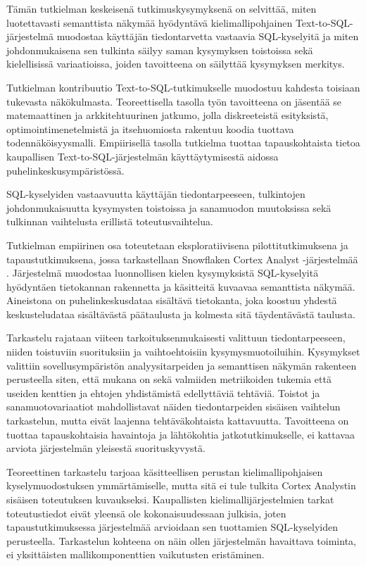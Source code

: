 Tämän tutkielman keskeisenä tutkimuskysymyksenä on selvittää, miten
luotettavasti semanttista näkymää hyödyntävä kielimallipohjainen
Text-to-SQL-järjestelmä muodostaa käyttäjän tiedontarvetta vastaavia
SQL-kyselyitä ja miten johdonmukaisena sen tulkinta säilyy saman
kysymyksen toistoissa sekä kielellisissä variaatioissa, joiden
tavoitteena on säilyttää kysymyksen merkitys.

Tutkielman kontribuutio Text-to-SQL-tutkimukselle muodostuu kahdesta toisiaan tukevasta näkökulmasta. Teoreettisella tasolla työn tavoitteena on jäsentää se matemaattinen ja arkkitehtuurinen jatkumo, jolla diskreeteistä esityksistä, optimointimenetelmistä ja itsehuomiosta rakentuu koodia tuottava todennäköisyysmalli. Empiirisellä tasolla tutkielma tuottaa tapauskohtaista tietoa
kaupallisen Text-to-SQL-järjestelmän käyttäytymisestä aidossa
puhelinkeskusympäristössä.

SQL-kyselyiden vastaavuutta käyttäjän tiedontarpeeseen, tulkintojen
johdonmukaisuutta kysymysten toistoissa ja sanamuodon muutoksissa
sekä tulkinnan vaihtelusta erillistä toteutusvaihtelua.

Tutkielman empiirinen osa toteutetaan eksploratiivisena
pilottitutkimuksena ja tapaustutkimuksena, jossa tarkastellaan
Snowflaken Cortex Analyst -järjestelmää \cite{CortexAnalyst}.
Järjestelmä muodostaa luonnollisen kielen kysymyksistä SQL-kyselyitä
hyödyntäen tietokannan rakennetta ja käsitteitä kuvaavaa semanttista
näkymää. Aineistona on puhelinkeskusdataa sisältävä tietokanta, joka
koostuu yhdestä keskusteludataa sisältävästä päätaulusta ja kolmesta
sitä täydentävästä taulusta.

Tarkastelu rajataan viiteen tarkoituksenmukaisesti valittuun
tiedontarpeeseen, niiden toistuviin suorituksiin ja vaihtoehtoisiin
kysymysmuotoiluihin. Kysymykset valittiin sovellusympäristön
analyysitarpeiden ja semanttisen näkymän rakenteen perusteella siten,
että mukana on sekä valmiiden metriikoiden tukemia että useiden
kenttien ja ehtojen yhdistämistä edellyttäviä tehtäviä. Toistot ja
sanamuotovariaatiot mahdollistavat näiden tiedontarpeiden sisäisen
vaihtelun tarkastelun, mutta eivät laajenna tehtäväkohtaista
kattavuutta. Tavoitteena on tuottaa tapauskohtaisia havaintoja ja
lähtökohtia jatkotutkimukselle, ei kattavaa arviota järjestelmän
yleisestä suorituskyvystä.

Teoreettinen tarkastelu tarjoaa käsitteellisen perustan kielimallipohjaisen kyselymuodostuksen ymmärtämiselle, mutta sitä ei tule tulkita Cortex Analystin sisäisen toteutuksen kuvaukseksi. Kaupallisten kielimallijärjestelmien tarkat toteutustiedot eivät yleensä ole kokonaisuudessaan julkisia, joten tapaustutkimuksessa järjestelmää arvioidaan sen tuottamien SQL-kyselyiden perusteella. Tarkastelun kohteena on näin ollen järjestelmän havaittava toiminta, ei yksittäisten mallikomponenttien vaikutusten eristäminen.

